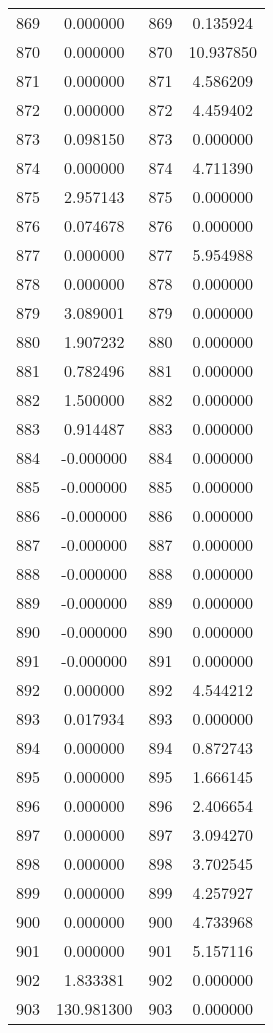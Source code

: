 \documentclass[12pt]{article}
\begin{document}
\begin{longtable}{@{}cccc@{}}
869 & 0.000000 & 869 & 0.135924 \\
870 & 0.000000 & 870 & 10.937850 \\
871 & 0.000000 & 871 & 4.586209 \\
872 & 0.000000 & 872 & 4.459402 \\
873 & 0.098150 & 873 & 0.000000 \\
874 & 0.000000 & 874 & 4.711390 \\
875 & 2.957143 & 875 & 0.000000 \\
876 & 0.074678 & 876 & 0.000000 \\
877 & 0.000000 & 877 & 5.954988 \\
878 & 0.000000 & 878 & 0.000000 \\
879 & 3.089001 & 879 & 0.000000 \\
880 & 1.907232 & 880 & 0.000000 \\
881 & 0.782496 & 881 & 0.000000 \\
882 & 1.500000 & 882 & 0.000000 \\
883 & 0.914487 & 883 & 0.000000 \\
884 & -0.000000 & 884 & 0.000000 \\
885 & -0.000000 & 885 & 0.000000 \\
886 & -0.000000 & 886 & 0.000000 \\
887 & -0.000000 & 887 & 0.000000 \\
888 & -0.000000 & 888 & 0.000000 \\
889 & -0.000000 & 889 & 0.000000 \\
890 & -0.000000 & 890 & 0.000000 \\
891 & -0.000000 & 891 & 0.000000 \\
892 & 0.000000 & 892 & 4.544212 \\
893 & 0.017934 & 893 & 0.000000 \\
894 & 0.000000 & 894 & 0.872743 \\
895 & 0.000000 & 895 & 1.666145 \\
896 & 0.000000 & 896 & 2.406654 \\
897 & 0.000000 & 897 & 3.094270 \\
898 & 0.000000 & 898 & 3.702545 \\
899 & 0.000000 & 899 & 4.257927 \\
900 & 0.000000 & 900 & 4.733968 \\
901 & 0.000000 & 901 & 5.157116 \\
902 & 1.833381 & 902 & 0.000000 \\
903 & 130.981300 & 903 & 0.000000 \\

\end{longtable}
\end{document}
